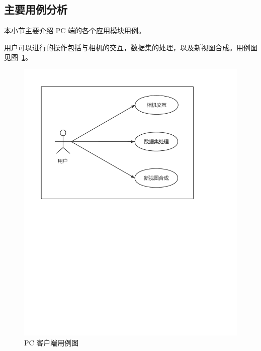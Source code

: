 \subsection{主要用例分析}
本小节主要介绍 PC 端的各个应用模块用例。

用户可以进行的操作包括与相机的交互，数据集的处理，以及新视图合成。用例图见图~\ref{fig:PCusercase}。

\pagebreak
\begin{figure}[htb]
	\centering
	\includegraphics[width=0.55\linewidth]{figures/usercase.pdf}
	\caption{PC 客户端用例图}
	\label{fig:PCusercase}
\end{figure}

